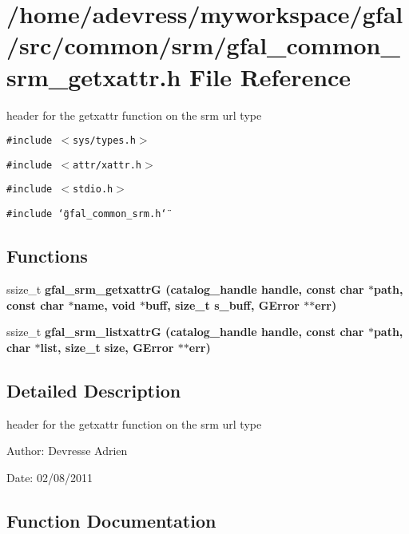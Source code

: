 \section{/home/adevress/myworkspace/gfal/src/common/srm/gfal\_\-common\_\-srm\_\-getxattr.h File Reference}
\label{gfal__common__srm__getxattr_8h}
header for the getxattr function on the srm url type 

{\tt \#include $<$sys/types.h$>$}\par
{\tt \#include $<$attr/xattr.h$>$}\par
{\tt \#include $<$stdio.h$>$}\par
{\tt \#include \char`\"{}gfal\_\-common\_\-srm.h\char`\"{}}\par
\subsection*{Functions}
\begin{CompactItemize}
\item 
ssize\_\-t \bf{gfal\_\-srm\_\-getxattr\-G} (catalog\_\-handle handle, const char $\ast$path, const char $\ast$name, void $\ast$buff, size\_\-t s\_\-buff, GError $\ast$$\ast$err)
\item 
ssize\_\-t \bf{gfal\_\-srm\_\-listxattr\-G} (catalog\_\-handle handle, const char $\ast$path, char $\ast$list, size\_\-t size, GError $\ast$$\ast$err)
\end{CompactItemize}


\subsection{Detailed Description}
header for the getxattr function on the srm url type 

\begin{Desc}
\item[Author:]Devresse Adrien \end{Desc}
\begin{Desc}
\item[Date:]02/08/2011 \end{Desc}


\subsection{Function Documentation}
